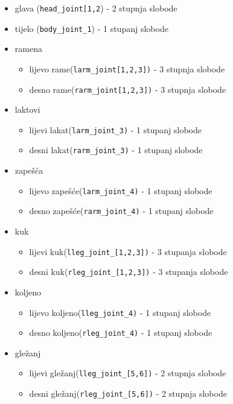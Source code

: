 \documentclass[times, utf8, zavrsni]{fer}
\begin{document}
\begin{itemize}
\item glava (\texttt{head\_joint[1,2}) - 2 stupnja slobode
\item tijelo (\texttt{body\_joint\_1}) - 1 stupanj slobode

\item ramena
\begin{itemize}
\item lijevo rame(\texttt{larm\_joint[1,2,3])} - 3 stupnja slobode	
\item desno rame(\texttt{rarm\_joint[1,2,3])} - 3 stupnja slobode	
\end{itemize} 

\item laktovi
\begin{itemize}
    \item lijevi lakat(\texttt{larm\_joint\_3)} - 1 stupanj slobode
    \item desni lakat(\texttt{rarm\_joint\_3)} - 1 stupanj slobode
\end{itemize}

\item zapešća
\begin{itemize}
    \item lijevo zapešće(\texttt{larm\_joint\_4)} - 1 stupanj slobode
    \item desno zapešće(\texttt{rarm\_joint\_4)} - 1 stupanj slobode
\end{itemize}

\item kuk
\begin{itemize}
    \item lijevi kuk(\texttt{lleg\_joint\_[1,2,3])} - 3 stupanja slobode
    \item desni kuk(\texttt{rleg\_joint\_[1,2,3])} - 3 stupanja slobode
\end{itemize}

\item koljeno
\begin{itemize}
    \item lijevo koljeno(\texttt{lleg\_joint\_4)} - 1 stupanj slobode
    \item desno koljeno(\texttt{rleg\_joint\_4)} - 1 stupanj slobode
\end{itemize}

\item gležanj
\begin{itemize}
    \item lijevi gležanj(\texttt{lleg\_joint\_[5,6])} - 2 stupnja slobode
    \item desni gležanj(\texttt{rleg\_joint\_[5,6])} - 2 stupnja slobode
\end{itemize}
\end{itemize}
\end{document}
